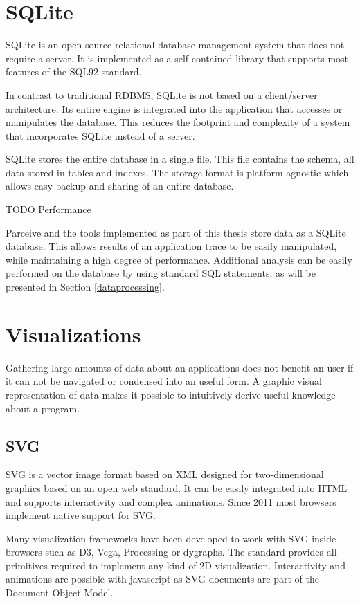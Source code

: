 \section{SQLite}

SQLite \cite{sqlitebook} is an open-source relational database management system that does not require a server. It is implemented as a self-contained library that supports most features of the SQL92 standard.

In contrast to traditional RDBMS, SQLite is not based on a client/server architecture. Its entire engine is integrated into the application that accesses or manipulates the database. This reduces the footprint and complexity of a system that incorporates SQLite instead of a server.

SQLite stores the entire database in a single file. This file contains the schema, all data stored in tables and indexes. The storage format is platform agnostic which allows easy backup and sharing of an entire database.

TODO Performance

Parceive and the tools implemented as part of this thesis store data as a SQLite database. This allows results of an application trace to be easily manipulated, while maintaining a high degree of performance. Additional analysis can be easily performed on the database by using standard SQL statements, as will be presented in Section \ref{dataprocessing}.

\section {Visualizations}

Gathering large amounts of data about an applications does not benefit an user if it can not be navigated or condensed into an useful form. A graphic visual representation of data makes it possible to intuitively derive useful knowledge about a program.

\subsection {SVG}

SVG \cite{svg11} is a vector image format based on XML designed for two-dimensional graphics based on an open web standard. It can be easily integrated into HTML and supports interactivity and complex animations. Since 2011 most browsers implement native support for SVG.

Many visualization frameworks have been developed to work with SVG inside browsers such as D3, Vega, Processing or dygraphs. The standard provides all primitives required to implement any kind of 2D visualization. Interactivity and animations are possible with javascript as SVG documents are part of the Document Object Model.


